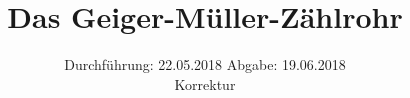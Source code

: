 

\subject{703}
\title{Das Geiger-Müller-Zählrohr}
\date{%
  Durchführung: 22.05.2018
  \hspace{3em}
  Abgabe: 19.06.2018 \\
  Korrektur
}



\maketitle
\thispagestyle{empty}
\tableofcontents
\newpage






\printbibliography{}


